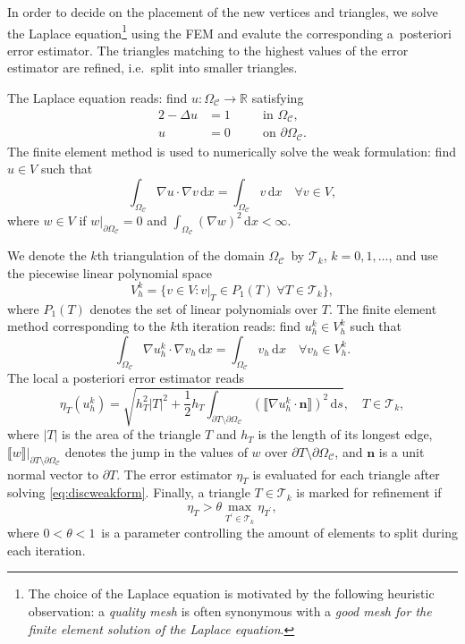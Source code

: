 \documentclass[11pt]{article}
\begin{document}
In order to decide on the placement of the new vertices and triangles, we solve
the Laplace equation\footnote{The choice of the Laplace equation is motivated by
the following heuristic observation: a \emph{quality mesh} is often synonymous with a \emph{good mesh for the
finite element solution of the Laplace equation}.} using the FEM and evalute the
corresponding a~posteriori error estimator.  The triangles matching
to the highest values of the error estimator are refined, i.e.~split
into smaller triangles.

The Laplace equation reads: find $u : \Omega_{\mathcal{C}} \rightarrow \mathbb{R}$ satisfying
\begin{alignat}{2}
-\Delta u &= 1 \quad && \text{in $\Omega_{\mathcal{C}}$,} \\
u &= 0 \quad && \text{on $\partial \Omega_{\mathcal{C}}$.}
\end{alignat}
The finite element method is used to numerically solve the
weak formulation: find \(u \in V\) such that
\begin{equation}
   \label{eq:weakform}
   \int_{\Omega_{\mathcal{C}}} \nabla u \cdot \nabla v \,\mathrm{d}x = \int_{\Omega_{\mathcal{C}}} v\,\mathrm{d}x \quad \forall v \in V,
\end{equation}
where
\(w \in V\) if \(w |_{\partial \Omega_{\mathcal{C}}} = 0\) and
$
   \int_{\Omega_{\mathcal{C}}} (\nabla w)^2 \,\mathrm{d}x < \infty.
$

We denote the \(k\)th triangulation of the
domain \(\Omega_{\mathcal{C}}\) by \(\mathcal{T}_k\), \(k=0,1,\dots\), and
use the piecewise linear polynomial space
$$V_h^k = \{ v \in V : v|_T \in P_1(T)~\forall T \in \mathcal{T}_k \},$$
where $P_1(T)$ denotes the set of linear polynomials over $T$.
The finite element method corresponding to the \(k\)th iteration reads:
find \(u_h^k \in V_h^k\) such that
\begin{equation}
   \label{eq:discweakform}
   \int_{\Omega_{\mathcal{C}}} \nabla u_h^k \cdot \nabla v_h \,\mathrm{d}x = \int_{\Omega_{\mathcal{C}}} v_h\,\mathrm{d}x \quad \forall v_h \in V_h^k.
\end{equation}
The local a posteriori error estimator
reads
\begin{equation}
        \eta_T(u_h^k) = \sqrt{h_T^2 |T|^2 + \frac12 h_T \int_{\partial T \setminus \partial \Omega_{\mathcal{C}}} (\llbracket \nabla u_h^k \cdot \boldsymbol{n} \rrbracket)^2 \,\mathrm{d}s}, \quad T \in \mathcal{T}_k,
\end{equation}
where $|T|$ is the area of the triangle $T$ and $h_T$ is the length of its longest edge, $\llbracket w \rrbracket |_{\partial T \setminus \partial \Omega_{\mathcal{C}}}$ denotes the jump in the values of
$w$ over $\partial T \setminus \partial \Omega_{\mathcal{C}}$, and $\boldsymbol{n}$ is a unit normal vector to
$\partial T$.
The error estimator $\eta_T$ is evaluated for each triangle
after solving \eqref{eq:discweakform}.
Finally, a triangle $T \in \mathcal{T}_k$ is marked for refinement if
\begin{equation}
  \label{eq:adaptivetheta}
   \eta_T > \theta \max_{T^\prime \in \mathcal{T}_k} \eta_{T^\prime},
\end{equation}
where $0 < \theta < 1$ is a parameter controlling the amount
of elements to split during each iteration.
\end{document}
